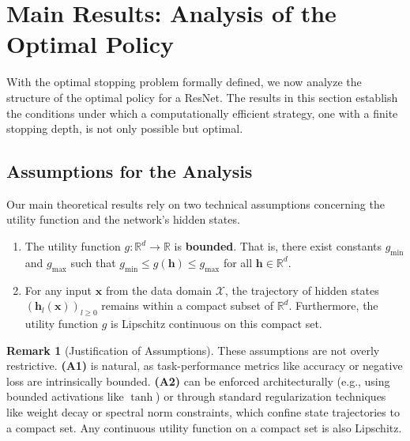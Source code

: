 \documentclass[12pt]{imsart}
\newcommand{\R}{\mathbb{R}}
\newcommand{\h}{\mathbf{h}}
\newcommand{\x}{\mathbf{x}}
\theoremstyle{plain}
\theoremstyle{definition}
\newtheorem{remark}[theorem]{Remark}
\begin{document}
\section{Main Results: Analysis of the Optimal Policy}
\label{sec:results}

With the optimal stopping problem formally defined, we now analyze the structure of the optimal policy for a ResNet. The results in this section establish the conditions under which a computationally efficient strategy, one with a finite stopping depth, is not only possible but optimal.

\subsection{Assumptions for the Analysis}
Our main theoretical results rely on two technical assumptions concerning the utility function and the network's hidden states.
\begin{enumerate}
    \item[\textbf{A1.}] The utility function $g: \R^d \to \R$ is \textbf{bounded}. That is, there exist constants $g_{\min}$ and $g_{\max}$ such that $g_{\min} \le g(\h) \le g_{\max}$ for all $\h \in \R^d$.
    \item[\textbf{A2.}] For any input $\x$ from the data domain $\mathcal{X}$, the trajectory of hidden states $(\h_l(\x))_{l \ge 0}$ remains within a compact subset of $\R^d$. Furthermore, the utility function $g$ is Lipschitz continuous on this compact set.
\end{enumerate}

\begin{remark}[Justification of Assumptions]\label{rem:assumptions_justification}
These assumptions are not overly restrictive. \textbf{(A1)} is natural, as task-performance metrics like accuracy or negative loss are intrinsically bounded. \textbf{(A2)} can be enforced architecturally (e.g., using bounded activations like $\tanh$) or through standard regularization techniques like weight decay or spectral norm constraints, which confine state trajectories to a compact set. Any continuous utility function on a compact set is also Lipschitz.
\end{remark}
\end{document}
